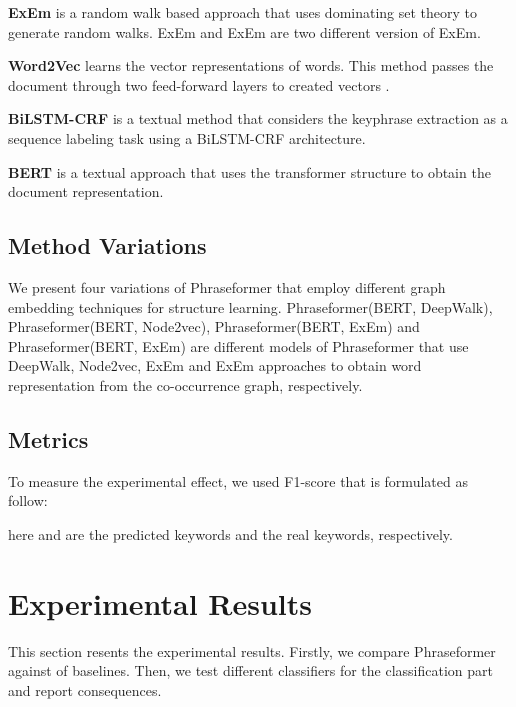\documentclass[review,3p]{elsarticle}
\begin{document}
\textbf{ExEm} \cite{nikzad2020exem}  is a random walk based approach that uses dominating set theory to generate random walks.  ExEm and ExEm are two different version of ExEm.

\textbf{Word2Vec} \cite{mikolov2013efficient} learns the vector representations of words. This method passes the document through two feed-forward layers to created vectors \cite{minaee2020deep}.

\textbf{BiLSTM-CRF} \cite{sahrawat2019keyphrase} is a textual method that considers the keyphrase extraction as a sequence labeling task using a BiLSTM-CRF  architecture.

\textbf{BERT} \cite{devlin2018bert} is a textual approach that uses the transformer structure to obtain the document representation.

\subsection{Method Variations}
We present four variations of Phraseformer that employ different graph embedding techniques for structure learning. Phraseformer(BERT, DeepWalk), Phraseformer(BERT, Node2vec), Phraseformer(BERT, ExEm) and Phraseformer(BERT, ExEm) are different models of Phraseformer that use DeepWalk, Node2vec, ExEm and ExEm approaches to obtain word representation from the co-occurrence graph, respectively.

\subsection{Metrics}
To measure the experimental effect, we used F1-score that is formulated as follow:



here  and  are the predicted keywords and the real keywords, respectively.



\section{Experimental Results}\label{evaluation_re}
This section resents  the  experimental results. Firstly, we compare Phraseformer against of baselines. Then, we test different classifiers for the classification part and report consequences.
\end{document}
